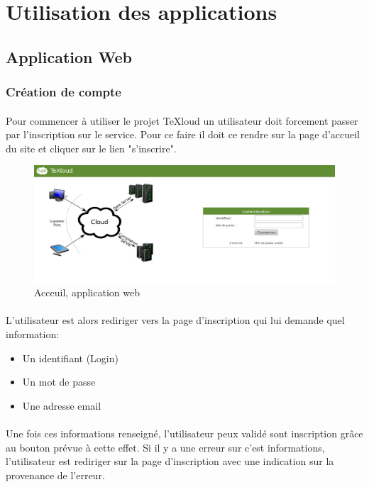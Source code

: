 \documentclass[a4paper,12pt]{article}
\begin{document}
\newpage
\section{Utilisation des applications}
\subsection{Application Web}
\subsubsection{Création de compte}
\paragraph*{}
Pour commencer à utiliser le projet TeXloud un utilisateur doit forcement passer par l'inscription sur le service. Pour ce faire il doit ce rendre sur la page d'accueil du site et cliquer sur le lien "s'inscrire".

\begin{figure}[!ht]
\begin{center}
  \includegraphics[width=1\textwidth]{./images/screenshot/Acceuil.png}
\end{center}
  \caption{Acceuil, application web}
  \label{acceuilWeb}
\end{figure}


\paragraph*{}
L'utilisateur est alors rediriger vers la page d'inscription qui lui demande quel information:
\begin{itemize}
 \item Un identifiant (Login)
 \item Un mot de passe 
 \item Une adresse email
\end{itemize}
\paragraph*{}
Une fois ces informations renseigné, l'utilisateur peux validé sont inscription grâce au bouton prévue à cette effet. Si il y a une erreur sur c'est informations, l'utilisateur est rediriger sur la page d'inscription avec une indication sur la provenance de l'erreur.
\end{document}
